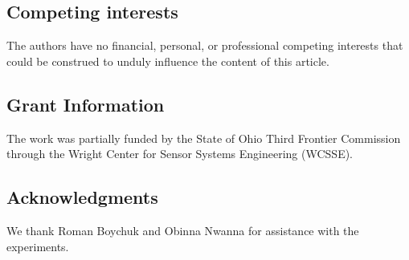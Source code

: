 \documentclass[fleqn,10pt]{wlpeerj}
\begin{document}
\subsection*{Competing interests}
The authors have no  financial, personal, or professional competing interests
that could be construed to unduly influence the content of this article.

\subsection*{Grant Information}
The work was partially funded by the State of Ohio Third Frontier Commission
through the Wright Center for Sensor Systems Engineering (WCSSE).

\subsection*{Acknowledgments}
We thank Roman Boychuk and Obinna Nwanna for assistance with the experiments.


\end{document}
